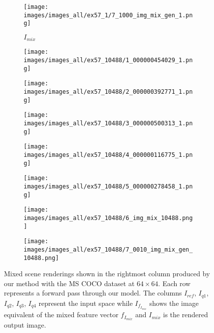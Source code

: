 \begin{figure}[h!]
     \begin{subfigure}[b]{0.135\textwidth}
         \centering
         \caption*{\textbf{$I_{mix}$}}
         \texttt{[image: images/images\_all/ex57\_1/7\_1000\_img\_mix\_gen\_1.png]}
         \label{fig:mixed_scene_ex_1_7}
     \end{subfigure}  
     \begin{subfigure}[b]{0.135\textwidth}
         \centering
         \texttt{[image: images/images\_all/ex57\_10488/1\_000000454029\_1.png]}
         \label{fig:mixed_scene_ex_2_1}
     \end{subfigure}  
     \hfill
     \begin{subfigure}[b]{0.135\textwidth}
         \centering
         \texttt{[image: images/images\_all/ex57\_10488/2\_000000392771\_1.png]}
         \label{fig:mixed_scene_ex_2_2}
     \end{subfigure}  
     \hfill
     \begin{subfigure}[b]{0.135\textwidth}
         \centering
         \texttt{[image: images/images\_all/ex57\_10488/3\_000000500313\_1.png]}
         \label{fig:mixed_scene_ex_2_3}
     \end{subfigure}  
     \hfill
     \begin{subfigure}[b]{0.135\textwidth}
         \centering
         \texttt{[image: images/images\_all/ex57\_10488/4\_000000116775\_1.png]}
         \label{fig:mixed_scene_ex_2_4}
     \end{subfigure}  
     \hfill
     \begin{subfigure}[b]{0.135\textwidth}
         \centering
         \texttt{[image: images/images\_all/ex57\_10488/5\_000000278458\_1.png]}
         \label{fig:mixed_scene_ex_2_5}
     \end{subfigure}  
     \hfill
     \begin{subfigure}[b]{0.135\textwidth}
         \centering
         \texttt{[image: images/images\_all/ex57\_10488/6\_img\_mix\_10488.png]}
         \label{fig:mixed_scene_ex_2_6}
     \end{subfigure}  
     \hfill
     \begin{subfigure}[b]{0.135\textwidth}
         \centering
         \texttt{[image: images/images\_all/ex57\_10488/7\_0010\_img\_mix\_gen\_10488.png]}
         \label{fig:mixed_scene_ex_2_7}
     \end{subfigure}  
    \caption{Mixed scene renderings shown in the rightmost column produced by our method with the MS COCO dataset at $64 \times 64$. Each row represents a forward pass through our model. The columns $I_{ref}$, $I_{q1}$, $I_{q2}$, $I_{q3}$, $I_{q4}$ represent the input space while $I_{f_{I_{mix}}}$ shows the image equivalent of the mixed feature vector $f_{I_{mix}}$ and $I_{mix}$ is the rendered output image.}
    \label{fig:results_lorbms_mixed_scenes}
\end{figure}